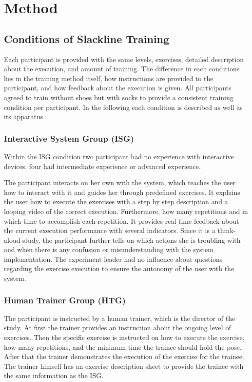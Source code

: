 \section{Method}\label{6_method}

\subsection{Conditions of Slackline Training}
Each participant is provided with the same levels, exercises, detailed description about the execution, and amount of training.
The difference in each conditions lies in the training method itself, how instructions are provided to the participant, and how feedback about the execution is given. All participants agreed to train without shoes but with socks to provide a consistent training condition per participant.
In the following each condition is described as well as its apparatus.

\subsubsection{Interactive System Group (ISG)}
Within the ISG condition two participant had no experience with interactive devices, four had intermediate experience or advanced experience.

The participant interacts on her own with the system, which teaches the user how to interact with it and guides her through predefined exercises.
It explains the user how to execute the exercises with a step by step description and a looping video of the correct execution.
Furthermore, how many repetitions and in which time to accomplish each repetition.
It provides real-time feedback about the current execution performance with several indicators.
Since it is a think-aloud study, the participant further tells on which actions she is troubling with and when there is any confusion or misunderstanding with the system implementation.
The experiment leader had no influence about questions regarding the exercise execution to ensure the autonomy of the user with the system.

\subsubsection{Human Trainer Group (HTG)}
The participant is instructed by a human trainer, which is the director of the study.
At first the trainer provides an instruction about the ongoing level of exercises.
Then the specific exercise is instructed on how to execute the exercise, how many repetitions, and the minimum time the trainee should hold the pose.
After that the trainer demonstrates the execution of the exercise for the trainee.
The trainer himself has an exercise description sheet to provide the trainee with the same information as the ISG.

